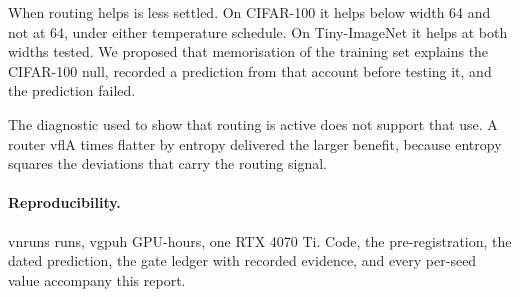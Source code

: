 \documentclass[10pt,a4paper]{article}
\newcommand{\V}[1]{\csname v#1\endcsname}
\begin{document}
When routing helps is less settled. On CIFAR-100 it helps below width 64
and not at 64, under either temperature schedule. On Tiny-ImageNet it
helps at both widths tested. We proposed that memorisation of the
training set explains the CIFAR-100 null, recorded a prediction from that
account before testing it, and the prediction failed.

The diagnostic used to show that routing is active does not support that
use. A router \V{flA} times flatter by entropy delivered the larger
benefit, because entropy squares the deviations that carry the routing
signal.

\paragraph{Reproducibility.} \V{nruns} runs, \V{gpuh} GPU-hours, one RTX
4070 Ti. Code, the pre-registration, the dated prediction, the gate
ledger with recorded evidence, and every per-seed value accompany this
report.
\end{document}
